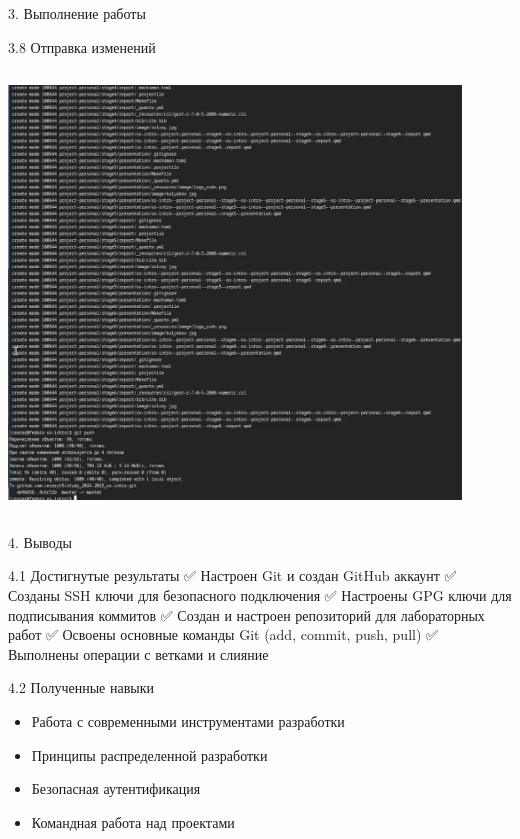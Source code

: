 \documentclass[
  ignorenonframetext,
  aspectratio=169,
]{beamer}
\providecommand{\tightlist}{%
  \setlength{\itemsep}{0pt}\setlength{\parskip}{0pt}}\usepackage{longtable,booktabs,array}
\begin{document}
\begin{frame}[fragile]{3. Выполнение работы}
\begin{block}{3.8 Отправка изменений}
\begin{columns}[c]
\begin{column}{0.4\textwidth}
\includegraphics[width=0.9\textwidth,height=\textheight]{./image/push.png}
\end{column}
\end{columns}
\end{block}
\end{frame}

\begin{frame}{4. Выводы}
\label{ux432ux44bux432ux43eux434ux44b}
\begin{block}{4.1 Достигнутые результаты}
\label{ux434ux43eux441ux442ux438ux433ux43dux443ux442ux44bux435-ux440ux435ux437ux443ux43bux44cux442ux430ux442ux44b}
✅ Настроен Git и создан GitHub аккаунт ✅ Созданы SSH ключи для
безопасного подключения ✅ Настроены GPG ключи для подписывания коммитов
✅ Создан и настроен репозиторий для лабораторных работ ✅ Освоены
основные команды Git (add, commit, push, pull) ✅ Выполнены операции с
ветками и слияние
\end{block}

\begin{block}{4.2 Полученные навыки}
\label{ux43fux43eux43bux443ux447ux435ux43dux43dux44bux435-ux43dux430ux432ux44bux43aux438}
\begin{itemize}[<+->]
\tightlist
\item
  Работа с современными инструментами разработки
\item
  Принципы распределенной разработки
\item
  Безопасная аутентификация
\item
  Командная работа над проектами
\end{itemize}
\end{block}
\end{frame}
\end{document}
